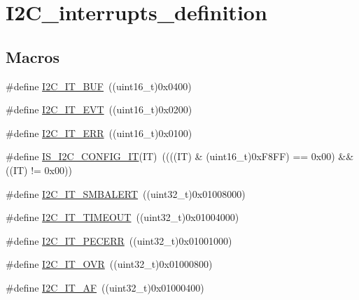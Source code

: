 \hypertarget{group___i2_c__interrupts__definition}{}\section{I2\+C\+\_\+interrupts\+\_\+definition}
\label{group___i2_c__interrupts__definition}
\subsection*{Macros}
\begin{DoxyCompactItemize}
\item 
\#define \mbox{\hyperlink{group___i2_c__interrupts__definition_gad3ff3f405b882aa4d2f91310aa1cc0df}{I2\+C\+\_\+\+I\+T\+\_\+\+B\+UF}}~((uint16\+\_\+t)0x0400)
\item 
\#define \mbox{\hyperlink{group___i2_c__interrupts__definition_gadd59efa313e1598a084a1e5ec3905b02}{I2\+C\+\_\+\+I\+T\+\_\+\+E\+VT}}~((uint16\+\_\+t)0x0200)
\item 
\#define \mbox{\hyperlink{group___i2_c__interrupts__definition_gadba3667b439cbf4ba1e6e9aec961ab03}{I2\+C\+\_\+\+I\+T\+\_\+\+E\+RR}}~((uint16\+\_\+t)0x0100)
\item 
\#define \mbox{\hyperlink{group___i2_c__interrupts__definition_gae2695a081871336881f9105d6c847c4f}{I\+S\+\_\+\+I2\+C\+\_\+\+C\+O\+N\+F\+I\+G\+\_\+\+IT}}(IT)~((((IT) \& (uint16\+\_\+t)0x\+F8\+F\+F) == 0x00) \&\& ((\+I\+T) != 0x00))
\item 
\#define \mbox{\hyperlink{group___i2_c__interrupts__definition_gab6049d4dd856a085127752e01ebb8120}{I2\+C\+\_\+\+I\+T\+\_\+\+S\+M\+B\+A\+L\+E\+RT}}~((uint32\+\_\+t)0x01008000)
\item 
\#define \mbox{\hyperlink{group___i2_c__interrupts__definition_ga45ce34b163b456a5fb3833f1264d93b4}{I2\+C\+\_\+\+I\+T\+\_\+\+T\+I\+M\+E\+O\+UT}}~((uint32\+\_\+t)0x01004000)
\item 
\#define \mbox{\hyperlink{group___i2_c__interrupts__definition_ga23069e7787c4f052f34887c02bc44100}{I2\+C\+\_\+\+I\+T\+\_\+\+P\+E\+C\+E\+RR}}~((uint32\+\_\+t)0x01001000)
\item 
\#define \mbox{\hyperlink{group___i2_c__interrupts__definition_ga8e1e9e73d9057ccfce3493b5cf672833}{I2\+C\+\_\+\+I\+T\+\_\+\+O\+VR}}~((uint32\+\_\+t)0x01000800)
\item 
\#define \mbox{\hyperlink{group___i2_c__interrupts__definition_gabfb721ac5783336e6d2334f635e2e91b}{I2\+C\+\_\+\+I\+T\+\_\+\+AF}}~((uint32\+\_\+t)0x01000400)
\item 

\end{DoxyCompactItemize}
